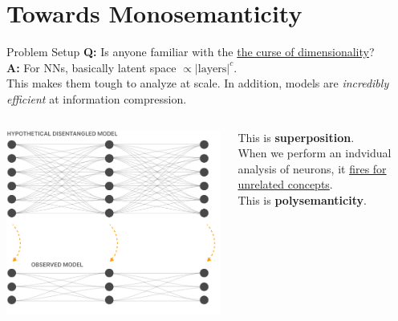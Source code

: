 \documentclass{beamer}
\begin{document}
\section{Towards Monosemanticity}
\begin{frame}{Problem Setup}
	\textbf{Q:} Is anyone familiar with the \underline{the curse of dimensionality}? \pause \\
	\textbf{A:} For NNs, basically latent space $\propto|\text{layers}|^c$. \newline \\

	This makes them tough to analyze at scale. \pause In addition, models are \textit{incredibly efficient} at information compression. \pause \newline \\

	\begin{columns}
		\begin{column}{.44\textwidth}
			\begin{center}
				\includegraphics[width=\textwidth]{img/superposition.png}
			\end{center}
		\end{column}
		\begin{column}{.5\textwidth}
			This is \textbf{superposition}. \pause \newline \\
			When we perform an indvidual analysis of neurons, it \underline{fires for unrelated concepts}. \newline \\

			This is \textbf{polysemanticity}.
		\end{column}
	\end{columns}
\end{frame}
\end{document}
